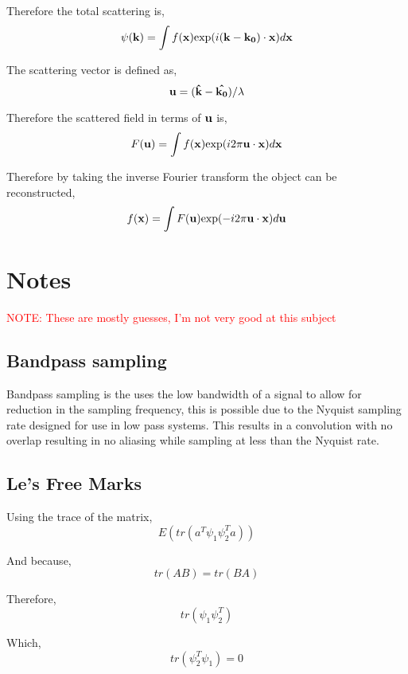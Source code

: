 \documentclass[12pt]{article}
\newcommand\todo[1]{\textcolor{red}{#1}}
\begin{document}
Therefore the total scattering is,
\begin{equation}
    \psi(\vb{k}) = \int f(\vb{x}) \textrm{exp}(i(\vb{k}-\vb{k_0}) \cdot \vb{x}) d\vb{x}
\end{equation}

The scattering vector is defined as,
\begin{equation}
    \vb{u} = (\vb{\hat{k}}-\vb{\hat{k_0}})/\lambda
\end{equation}

Therefore the scattered field in terms of $\vb{u}$ is,
\begin{equation}
    F(\vb{u})=\int f(\vb{x}) \textrm{exp}(i2\pi \vb{u} \cdot \vb{x}) d\vb{x}
\end{equation}

Therefore by taking the inverse Fourier transform the object can be reconstructed,
\begin{equation}
    f(\vb{x}) = \int F(\vb{u}) \textrm{exp} (-i2\pi \vb{u} \cdot \vb{x}) d\vb{u}
\end{equation}

\newpage

\section{Notes}
\todo{NOTE: These are mostly guesses, I'm not very good at this subject} 

\subsection{Bandpass sampling}
Bandpass sampling is the uses the low bandwidth of a signal to allow for reduction
in the sampling frequency, this is possible due to the Nyquist sampling rate
designed for use in low pass systems. This results in a convolution with no overlap
resulting in no aliasing while sampling at less than the Nyquist rate.


\subsection{Le's Free Marks}
Using the trace of the matrix,
\begin{equation}
    E(tr(a^T\psi_1\psi_2^Ta))
\end{equation}

And because,
\begin{equation}
    tr(AB) = tr(BA)
\end{equation}

Therefore,
\begin{equation}
    tr(\psi_1\psi_2^T)
\end{equation}

Which,
\begin{equation}
    tr(\psi_2^T\psi_1) = 0
\end{equation}
\end{document}
